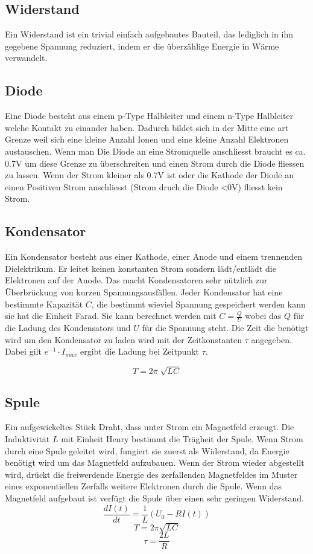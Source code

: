\documentclass{article}
\begin{document}
\subsection{Widerstand}
Ein Widerstand ist ein trivial einfach aufgebautes Bauteil, das lediglich in ihn gegebene Spannung reduziert, indem er die überzählige Energie in Wärme verwandelt.
\subsection{Diode}
Eine Diode besteht aus einem p-Type Halbleiter und einem n-Type Halbleiter welche Kontakt zu einander haben. Dadurch bildet sich in der Mitte eine art Grenze weil sich eine kleine Anzahl Ionen und eine kleine Anzahl Elektronen austauschen. Wenn man Die Diode an eine Stromquelle anschliesst braucht es ca. 0.7V um diese Grenze zu überschreiten und einen Strom durch die Diode fliessen zu lassen. Wenn der Strom kleiner als 0.7V ist oder die Kathode der Diode an einen Positiven Strom anschliesst (Strom druch die Diode <0V) fliesst kein Strom.
\subsection{Kondensator}
Ein Kondensator besteht aus einer Kathode, einer Anode und einem trennenden Dielektrikum. Er leitet keinen konstanten Strom sondern lädt/entlädt die Elektronen auf der Anode. Das macht Kondensatoren sehr nützlich zur Überbrückung von kurzen Spannungsausfällen. Jeder Kondensator hat eine bestimmte Kapazität \(C\), die bestimmt wieviel Spannung gespeichert werden kann sie hat die Einheit Farad. Sie kann berechnet werden mit \(C = \frac{Q}{U} \) wobei das \(Q\) für die Ladung des Kondensators und \(U\) für die Spannung steht. Die Zeit die benötigt wird um den Kondensator zu laden wird mit der Zeitkonstanten \(\tau\) angegeben. Dabei gilt \(e^{-1} \cdot I_{max}\) ergibt die Ladung bei Zeitpunkt \(\tau\).

\[
T=2\pi \sqrt[]{LC}
\]
\subsection{Spule}
Ein aufgewickeltes Stück Draht, dass unter Strom ein Magnetfeld erzeugt. Die Induktivität \(L\) mit Einheit Henry bestimmt die Trägheit der Spule. Wenn Strom durch eine Spule geleitet wird, fungiert sie zuerst als Widerstand, da Energie benötigt wird um das Magnetfeld aufzubauen. Wenn der Strom wieder abgestellt wird, drückt die freiwerdende Energie des zerfallenden Magnetfeldes im Muster eines exponentiellen Zerfalls weitere Elektronen durch die Spule. Wenn das Magnetfeld aufgebaut ist verfügt die Spule über einen sehr geringen Widerstand.
\[\frac{dI(t)}{dt}=\frac{1}{L}(U_0-RI(t))\]
\[T=2\pi\sqrt{LC}\]
\[\tau = \frac{2L}{R}\]
\end{document}
